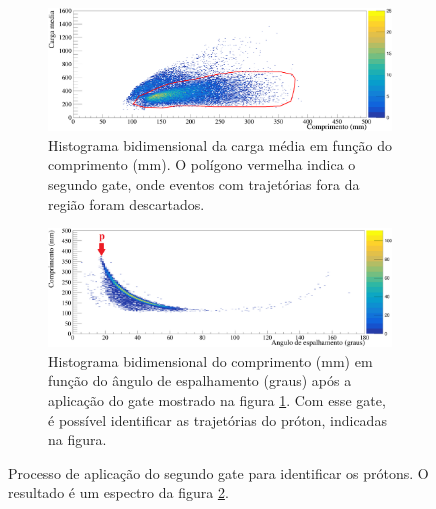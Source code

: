 \documentclass[a4paper,12pt,oneside]{book}
\begin{document}

\begin{figure}[H]
\centering
    \begin{subfigure}[b]{\textwidth}
        \centering
        \includegraphics[scale = 0.5, width=\columnwidth]{figs/carga_media_vs_comp_cut1.png}
        \caption{Histograma bidimensional da carga média em função do comprimento (mm). O polígono vermelha indica o segundo gate, onde eventos com trajetórias fora da região foram descartados.}
        \label{subfig:gate2_antes}
    \end{subfigure}%
    \hfill
    \begin{subfigure}[b]{\textwidth}
        \centering
        \includegraphics[scale=0.5, width=\columnwidth]{figs/comp_vs_ang_n2_cut12.png}
        \caption{Histograma bidimensional do comprimento (mm) em função do ângulo de espalhamento (graus) após a aplicação do gate mostrado na figura \ref{subfig:gate2_antes}. Com esse gate, é possível identificar as trajetórias do próton, indicadas na figura.}
        \label{subfig:gate2_depois}
    \end{subfigure}%
	\hfill
\caption{Processo de aplicação do segundo gate para identificar os prótons. O resultado é um espectro da figura \ref{subfig:gate2_depois}.}
\label{fig:gate_2}
\end{figure}
\end{document}
